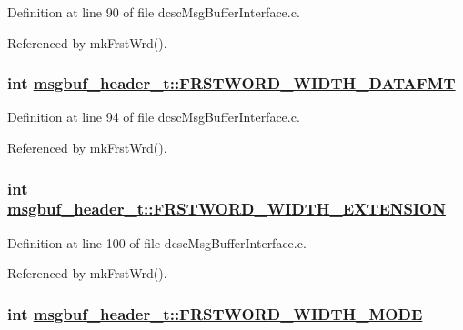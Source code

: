 Definition at line 90 of file dcsc\-Msg\-Buffer\-Interface.c.

Referenced by mk\-Frst\-Wrd().\hypertarget{structmsgbuf__header__t_e78c1f0a8758ef8d18056b01f664b720}{
\subsubsection[FRSTWORD\_\-WIDTH\_\-DATAFMT]{\setlength{\rightskip}{0pt plus 5cm}int \hyperlink{structmsgbuf__header__t_e78c1f0a8758ef8d18056b01f664b720}{msgbuf\_\-header\_\-t::FRSTWORD\_\-WIDTH\_\-DATAFMT}}}
\label{structmsgbuf__header__t_e78c1f0a8758ef8d18056b01f664b720}




Definition at line 94 of file dcsc\-Msg\-Buffer\-Interface.c.

Referenced by mk\-Frst\-Wrd().\hypertarget{structmsgbuf__header__t_b43999f0c0b835ebe7e5543577e68ec9}{
\subsubsection[FRSTWORD\_\-WIDTH\_\-EXTENSION]{\setlength{\rightskip}{0pt plus 5cm}int \hyperlink{structmsgbuf__header__t_b43999f0c0b835ebe7e5543577e68ec9}{msgbuf\_\-header\_\-t::FRSTWORD\_\-WIDTH\_\-EXTENSION}}}
\label{structmsgbuf__header__t_b43999f0c0b835ebe7e5543577e68ec9}




Definition at line 100 of file dcsc\-Msg\-Buffer\-Interface.c.

Referenced by mk\-Frst\-Wrd().\hypertarget{structmsgbuf__header__t_427f985416682eb84096a402daf34442}{
\subsubsection[FRSTWORD\_\-WIDTH\_\-MODE]{\setlength{\rightskip}{0pt plus 5cm}int \hyperlink{structmsgbuf__header__t_427f985416682eb84096a402daf34442}{msgbuf\_\-header\_\-t::FRSTWORD\_\-WIDTH\_\-MODE}}}
\label{structmsgbuf__header__t_427f985416682eb84096a402daf34442}




